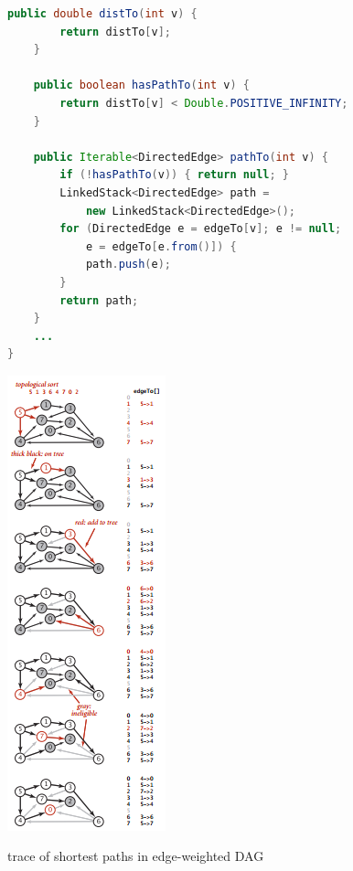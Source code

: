 \documentclass[8pt,a4paper,compress]{beamer}
\begin{document}
\begin{frame}[fragile]
\begin{minipage}{220pt}
\begin{lstlisting}[language=Java]
    public double distTo(int v) { 
        return distTo[v]; 
    }

    public boolean hasPathTo(int v) { 
        return distTo[v] < Double.POSITIVE_INFINITY; 
    }
    
    public Iterable<DirectedEdge> pathTo(int v) {
        if (!hasPathTo(v)) { return null; }
        LinkedStack<DirectedEdge> path = 
            new LinkedStack<DirectedEdge>();
        for (DirectedEdge e = edgeTo[v]; e != null; 
            e = edgeTo[e.from()]) {
            path.push(e);
        }
        return path;
    }
    ...
}
\end{lstlisting}
\end{minipage}%
\begin{minipage}{80pt}
\begin{center}
\includegraphics[scale=0.42]{./figures/sp5.png}

\smallskip

\small trace of shortest paths in edge-weighted DAG
\end{center}
\end{minipage}
\end{frame}
\end{document}
